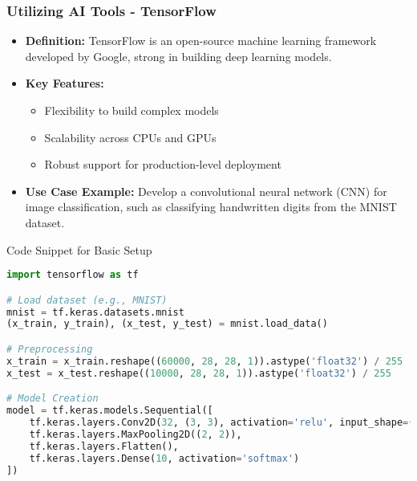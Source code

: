 \documentclass[aspectratio=169]{beamer}
\begin{document}
\begin{frame}[fragile]
    \frametitle{Utilizing AI Tools - TensorFlow}
    \begin{itemize}
        \item \textbf{Definition:} TensorFlow is an open-source machine learning framework developed by Google, strong in building deep learning models.
        \item \textbf{Key Features:}
        \begin{itemize}
            \item Flexibility to build complex models
            \item Scalability across CPUs and GPUs
            \item Robust support for production-level deployment
        \end{itemize}
        \item \textbf{Use Case Example:} Develop a convolutional neural network (CNN) for image classification, such as classifying handwritten digits from the MNIST dataset.
    \end{itemize}
    \begin{block}{Code Snippet for Basic Setup}
    \begin{lstlisting}[language=Python]
import tensorflow as tf

# Load dataset (e.g., MNIST)
mnist = tf.keras.datasets.mnist
(x_train, y_train), (x_test, y_test) = mnist.load_data()

# Preprocessing
x_train = x_train.reshape((60000, 28, 28, 1)).astype('float32') / 255
x_test = x_test.reshape((10000, 28, 28, 1)).astype('float32') / 255

# Model Creation
model = tf.keras.models.Sequential([
    tf.keras.layers.Conv2D(32, (3, 3), activation='relu', input_shape=(28, 28, 1)),
    tf.keras.layers.MaxPooling2D((2, 2)),
    tf.keras.layers.Flatten(),
    tf.keras.layers.Dense(10, activation='softmax')
])
    \end{lstlisting}
    \end{block}
\end{frame}
\end{document}
